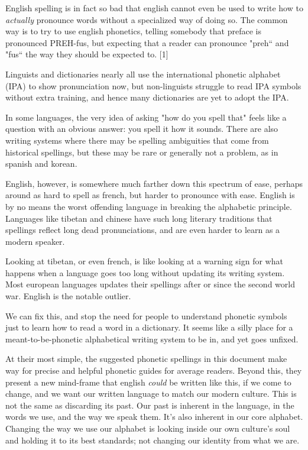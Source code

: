 \documentclass{article}
\begin{document}
English spelling is in fact so bad that english cannot even be used to write how
to \textit{actually} pronounce words without a specialized way of doing so. The
common way is to try to use english phonetics, telling somebody that preface is
pronounced PREH-fus, but expecting that a reader can pronounce "preh`` and
"fus`` the way they should be expected to. [1]

Linguists and dictionaries nearly all use the international phonetic alphabet
(IPA) to show pronunciation now, but non-linguists struggle to read IPA symbols
without extra training, and hence many dictionaries are yet to adopt the IPA.

In some languages, the very idea of asking "how do you spell that" feels like a
question with an obvious answer: you spell it how it sounds. There are also
writing systems where there may be spelling ambiguities that come from
historical spellings, but these may be rare or generally not a problem, as in
spanish and korean.

English, however, is somewhere much farther down this spectrum of ease, perhaps
around as hard to spell as french, but harder to pronounce with ease. English is
by no means the worst offending language in breaking the alphabetic principle.
Languages like tibetan and chinese have such long literary traditions that
spellings reflect long dead pronunciations, and are even harder to learn as a
modern speaker.

Looking at tibetan, or even french, is like looking at a warning sign for what
happens when a language goes too long without updating its writing system. Most
european languages updates their spellings after or since the second world war.
English is the notable outlier.

We can fix this, and stop the need for people to understand phonetic symbols
just to learn how to read a word in a dictionary. It seems like a silly place
for a meant-to-be-phonetic alphabetical writing system to be in, and yet goes
unfixed.

At their most simple, the suggested phonetic spellings in this document make way
for precise and helpful phonetic guides for average readers. Beyond this, they
present a new mind-frame that english \textit{could} be written like this, if
we come to change, and we want our written language to match our modern culture.
This is not the same as discarding its past. Our past is inherent in the
language, in the words we use, and the way we speak them. It's also inherent in
our core alphabet. Changing the way we use our alphabet is looking inside our
own culture's soul and holding it to its best standards; not changing our
identity from what we are.
\end{document}
